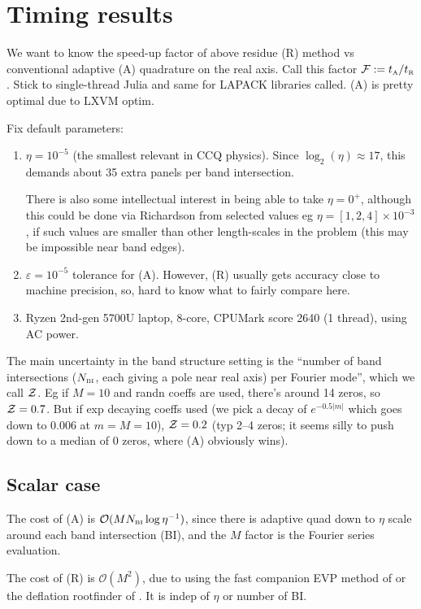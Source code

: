 \documentclass[11pt]{article}
\newcommand{\ben}{\begin{enumerate}}
\newcommand{\een}{\end{enumerate}}
\newcommand{\tbox}[1]{{\mbox{\tiny #1}}}
\newcommand{\eps}{\varepsilon}
\newcommand{\bigO}{{\mathcal O}}
\begin{document}
\section{Timing results}

We want to know the speed-up factor of above residue (R) method vs
conventional adaptive (A) quadrature on the real axis.
Call this
factor ${\cal F} := t_\tbox{A}/t_\tbox{R}$.
Stick to single-thread Julia and same for LAPACK libraries called.
(A) is pretty optimal due to LXVM optim.

Fix default parameters:
\ben
\item
  $\eta=10^{-5}$ (the smallest relevant in CCQ physics).
  Since $\log_2(\eta) \approx 17$, this demands about 35 extra panels per band
  intersection.

  There is also some intellectual interest in being able to take
  $\eta=0^+$, although this could be done via Richardson from selected
  values eg $\eta = [1,2,4]\times 10^{-3}$, if such values are smaller than
  other length-scales in the problem (this may be impossible near band edges).
\item
  $\eps = 10^{-5}$ tolerance for (A). However, (R) usually gets accuracy
  close to machine precision,
  so, hard to know what to fairly compare here.
\item Ryzen 2nd-gen 5700U laptop, 8-core, CPUMark score 2640 (1 thread),
  using AC power.
\een
  
The main uncertainty in the band structure setting is the
``number of band intersections ($N_\tbox{BI}$, each giving a pole near real axis) per Fourier mode'',
which we call ${\cal Z}$.
Eg if $M=10$ and randn coeffs are used, there's around 14 zeros,
so ${\cal Z} = 0.7$.
But if exp decaying
coeffs used (we pick a decay of $e^{-0.5|m|}$ which goes down to
0.006 at $m=M=10$),
${\cal Z} = 0.2$ (typ 2--4 zeros; it seems silly to push down
to a median of 0 zeros, where (A) obviously wins).


\subsection{Scalar case}

The cost of (A) is $\bigO(M N_\tbox{BI} \log \eta^{-1})$,
since there is adaptive quad down to $\eta$ scale around each band intersection
(BI), and the $M$ factor is the Fourier series evaluation.

The cost of (R) is $\bigO(M^2)$, due to using the fast companion EVP
method of \cite{aurentz1,aurentz2} or the deflation rootfinder
of \cite{skowron}.
It is indep of $\eta$ or number of BI.
\end{document}
